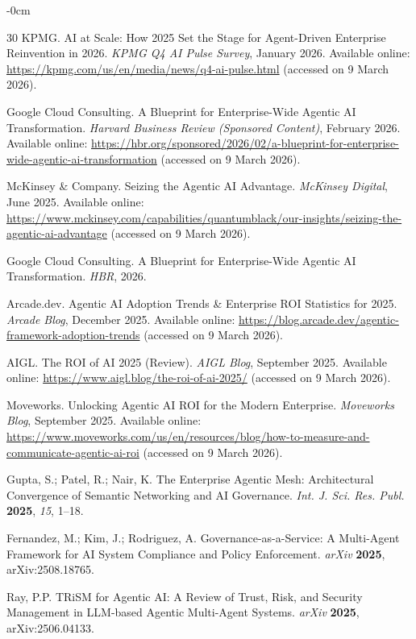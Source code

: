 \documentclass[ai,article,submit,pdftex,moreauthors]{Definitions/mdpi}
\begin{document}
\begin{adjustwidth}{-\extralength}{0cm}
\begin{thebibliography}{30}
KPMG.
AI at Scale: How 2025 Set the Stage for Agent-Driven Enterprise Reinvention in 2026.
\textit{KPMG Q4 AI Pulse Survey}, January 2026.
Available online: \url{https://kpmg.com/us/en/media/news/q4-ai-pulse.html} (accessed on 9 March 2026).

Google Cloud Consulting.
A Blueprint for Enterprise-Wide Agentic AI Transformation.
\textit{Harvard Business Review (Sponsored Content)}, February 2026.
Available online: \url{https://hbr.org/sponsored/2026/02/a-blueprint-for-enterprise-wide-agentic-ai-transformation} (accessed on 9 March 2026).

McKinsey \& Company.
Seizing the Agentic AI Advantage.
\textit{McKinsey Digital}, June 2025.
Available online: \url{https://www.mckinsey.com/capabilities/quantumblack/our-insights/seizing-the-agentic-ai-advantage} (accessed on 9 March 2026).

Google Cloud Consulting.
A Blueprint for Enterprise-Wide Agentic AI Transformation.
\textit{HBR}, 2026.

Arcade.dev.
Agentic AI Adoption Trends \& Enterprise ROI Statistics for 2025.
\textit{Arcade Blog}, December 2025.
Available online: \url{https://blog.arcade.dev/agentic-framework-adoption-trends} (accessed on 9 March 2026).

AIGL.
The ROI of AI 2025 (Review).
\textit{AIGL Blog}, September 2025.
Available online: \url{https://www.aigl.blog/the-roi-of-ai-2025/} (accessed on 9 March 2026).

Moveworks.
Unlocking Agentic AI ROI for the Modern Enterprise.
\textit{Moveworks Blog}, September 2025.
Available online: \url{https://www.moveworks.com/us/en/resources/blog/how-to-measure-and-communicate-agentic-ai-roi} (accessed on 9 March 2026).

Gupta, S.; Patel, R.; Nair, K.
The Enterprise Agentic Mesh: Architectural Convergence of Semantic Networking and AI Governance.
\textit{Int. J. Sci. Res. Publ.} \textbf{2025}, \textit{15}, 1--18.

Fernandez, M.; Kim, J.; Rodriguez, A.
Governance-as-a-Service: A Multi-Agent Framework for AI System Compliance and Policy Enforcement.
\textit{arXiv} \textbf{2025}, arXiv:2508.18765.

Ray, P.P.
TRiSM for Agentic AI: A Review of Trust, Risk, and Security Management in LLM-based Agentic Multi-Agent Systems.
\textit{arXiv} \textbf{2025}, arXiv:2506.04133.


\end{thebibliography}
\end{adjustwidth}
\end{document}
